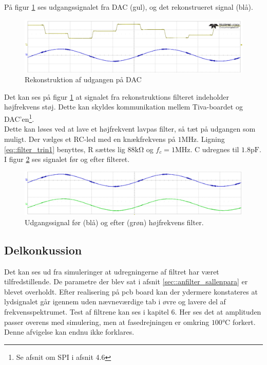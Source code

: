På figur \ref{fig::anfilter_recon} ses udgangssignalet fra DAC (gul), og det rekonstrueret signal (blå).
\begin{figure}[h!]
	\centering
	\includegraphics[scale = 0.4]{./billeder/reconstruction}
	\caption{Rekonstruktion af udgangen på DAC}
	\label{fig::anfilter_recon}
\end{figure}
\FloatBlock


Det kan ses på figur \ref{fig::anfilter_recon} at signalet fra rekonstruktions filteret indeholder højfrekvens støj. Dette kan skyldes kommunikation mellem Tiva-boardet og DAC'en\footnote{Se afsnit om SPI i afsnit 4.6}. \\
Dette kan løses ved at lave et højfrekvent lavpas filter, så tæt på udgangen som muligt. Der vælges et RC-led med en knækfrekvens på $1\si{\mega\hertz}$. Ligning \ref{eq::filter_trin1} benyttes, R sættes lig $88\si{\kilo\ohm}$ og $f_c = 1\si{\mega\hertz}$. C udregnes til $1.8\si{\pico\farad}$. I figur \ref{fig::anfilter_hf} ses signalet før og efter filteret.



\begin{figure}[h!]
	\centering
	\includegraphics[scale = 0.55]{./billeder/hf.png}
	\caption{Udgangssignal før (blå) og efter (grøn) højfrekvens filter.}
	\label{fig::anfilter_hf}
\end{figure}
\FloatBlock

\subsection{Delkonkussion}
Det kan ses ud fra simuleringer at udregningerne af filtret har været tilfredstillende. De parametre der blev sat i afsnit \ref{sec::anfilter_sallenpara} er blevet overholdt. Efter realisering på pcb board kan der  ydermere konstateres at lydsignalet går igennem uden nævneværdige tab i øvre og lavere del af frekvensspektrumet. Test af filtrene kan ses i kapitel 6. Her ses det at amplituden passer overens med simulering, men at fasedrejningen er omkring $100 \si{\celsius}$ forkert. Denne afvigelse kan endnu ikke forklares.